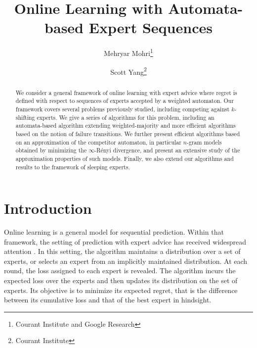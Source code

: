 \documentclass{article}
\newcommand{\ignore}[1]{}
\begin{document}
\title{Online Learning with Automata-based Expert Sequences}

\author{Mehryar Mohri\footnote{Courant Institute and Google Research}
\and
Scott Yang\footnote{Courant Institute}}

\maketitle

\begin{abstract}
  We consider a general framework of online learning with expert
  advice where regret is defined with respect to sequences of
  experts accepted by a weighted automaton. Our framework covers
  several problems previously studied, including competing against
  $k$-shifting experts. We give a series of algorithms for this
  problem, including an automata-based algorithm extending
  weighted-majority and more efficient algorithms based on the notion
  of failure transitions.  We further present efficient algorithms
  based on an approximation of the competitor automaton, in particular
  $n$-gram models obtained by minimizing the $\infty$-R\'enyi
  divergence, and present an extensive study of the approximation
  properties of such models. Finally, we also extend our algorithms and results
  to the framework of sleeping experts. \ignore{Finally, we describe the
  extension of our approximation methods to online convex optimization
  and a general mirror descent setting.}
\end{abstract}

\section{Introduction}
\label{sec:intro}
 
Online learning is a general model for sequential prediction. Within
that framework, the setting of prediction with expert advice has
received widespread attention \citep{LittlestoneWarmuth1994,
  CesaBianchiLugosi2006,CesaBianchiMansourStoltz2007}.  In this
setting, the algorithm maintains a distribution over a set of experts,
or selects an expert from an implicitly maintained distribution.  At
each round, the loss assigned to each expert is revealed. The
algorithm incurs the expected loss over the experts and then updates
its distribution on the set of experts.  Its objective is to minimize
its expected regret, that is the difference between its cumulative
loss and that of the best expert in hindsight.
\end{document}

